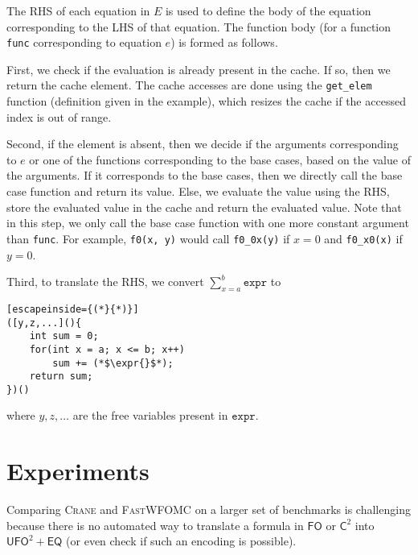\documentclass{article}
\newcommand{\expr}{\mathtt{expr}}
\newcommand{\Ctwo}{$\mathsf{C}^{2}$}
\newcommand{\FO}{$\mathsf{FO}$}
\newcommand{\UFO}{$\mathsf{UFO}^{2} + \mathsf{EQ}$}
\begin{document}
The RHS of each equation in $E$ is used to define the body of the equation
corresponding to the LHS of that equation. The function body (for a function
\texttt{func} corresponding to equation $e$) is formed as follows.

First, we check if the evaluation is already present in the cache. If so, then
we return the cache element. The cache accesses are done using the
\texttt{get\_elem} function (definition given in the example), which resizes the
cache if the accessed index is out of range.

Second, if the element is absent, then we decide if the arguments corresponding
to $e$ or one of the functions corresponding to the base cases, based on the
value of the arguments. If it corresponds to the base cases, then we directly
call the base case function and return its value. Else, we evaluate the value
using the RHS, store the evaluated value in the cache and return the evaluated
value. Note that in this step, we only call the base case function with one more
constant argument than \texttt{func}. For example, \texttt{f0(x, y)} would call
\texttt{f0\_0x(y)} if $x = 0$ and \texttt{f0\_x0(x)} if $y = 0$.

Third, to translate the RHS, we convert $\sum_{x=a}^{b} \expr{}$ to
\begin{lstlisting}[escapeinside={(*}{*)}]
([y,z,...](){
    int sum = 0;
    for(int x = a; x <= b; x++)
        sum += (*$\expr{}$*);
    return sum;
})()
\end{lstlisting}
where $y, z, \dots$ are the free variables present in $\expr{}$.

\section{Experiments}

Comparing \textsc{Crane} and \textsc{FastWFOMC} on a larger set of benchmarks is
challenging because there is no automated way to translate a formula in \FO{} or
\Ctwo{} into \UFO{} (or even check if such an encoding is possible).
\end{document}
